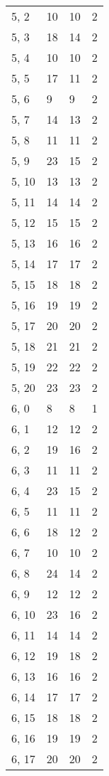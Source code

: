 \begin{table}
\begin{tabular}{llll}
5, 2   &   10 &   10 &     2 \\
5, 3   &   18 &   14 &     2 \\
5, 4   &   10 &   10 &     2 \\
5, 5   &   17 &   11 &     2 \\
5, 6   &    9 &    9 &     2 \\
5, 7   &   14 &   13 &     2 \\
5, 8   &   11 &   11 &     2 \\
5, 9   &   23 &   15 &     2 \\
5, 10  &   13 &   13 &     2 \\
5, 11  &   14 &   14 &     2 \\
5, 12  &   15 &   15 &     2 \\
5, 13  &   16 &   16 &     2 \\
5, 14  &   17 &   17 &     2 \\
5, 15  &   18 &   18 &     2 \\
5, 16  &   19 &   19 &     2 \\
5, 17  &   20 &   20 &     2 \\
5, 18  &   21 &   21 &     2 \\
5, 19  &   22 &   22 &     2 \\
5, 20  &   23 &   23 &     2 \\
6, 0   &    8 &    8 &     1 \\
6, 1   &   12 &   12 &     2 \\
6, 2   &   19 &   16 &     2 \\
6, 3   &   11 &   11 &     2 \\
6, 4   &   23 &   15 &     2 \\
6, 5   &   11 &   11 &     2 \\
6, 6   &   18 &   12 &     2 \\
6, 7   &   10 &   10 &     2 \\
6, 8   &   24 &   14 &     2 \\
6, 9   &   12 &   12 &     2 \\
6, 10  &   23 &   16 &     2 \\
6, 11  &   14 &   14 &     2 \\
6, 12  &   19 &   18 &     2 \\
6, 13  &   16 &   16 &     2 \\
6, 14  &   17 &   17 &     2 \\
6, 15  &   18 &   18 &     2 \\
6, 16  &   19 &   19 &     2 \\
6, 17  &   20 &   20 &     2 \\

\end{tabular}
\end{table}
